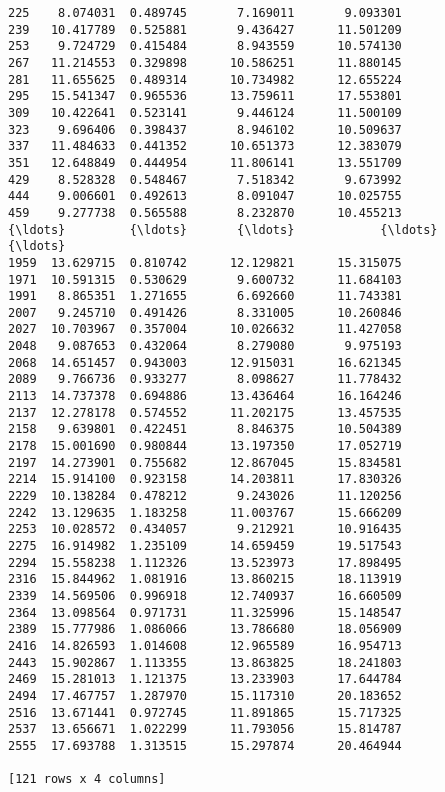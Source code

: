 \documentclass[11pt]{article}
\begin{document}
\begin{Verbatim}[commandchars=\\\{\}]
225    8.074031  0.489745       7.169011       9.093301
239   10.417789  0.525881       9.436427      11.501209
253    9.724729  0.415484       8.943559      10.574130
267   11.214553  0.329898      10.586251      11.880145
281   11.655625  0.489314      10.734982      12.655224
295   15.541347  0.965536      13.759611      17.553801
309   10.422641  0.523141       9.446124      11.500109
323    9.696406  0.398437       8.946102      10.509637
337   11.484633  0.441352      10.651373      12.383079
351   12.648849  0.444954      11.806141      13.551709
429    8.528328  0.548467       7.518342       9.673992
444    9.006601  0.492613       8.091047      10.025755
459    9.277738  0.565588       8.232870      10.455213
{\ldots}         {\ldots}       {\ldots}            {\ldots}            {\ldots}
1959  13.629715  0.810742      12.129821      15.315075
1971  10.591315  0.530629       9.600732      11.684103
1991   8.865351  1.271655       6.692660      11.743381
2007   9.245710  0.491426       8.331005      10.260846
2027  10.703967  0.357004      10.026632      11.427058
2048   9.087653  0.432064       8.279080       9.975193
2068  14.651457  0.943003      12.915031      16.621345
2089   9.766736  0.933277       8.098627      11.778432
2113  14.737378  0.694886      13.436464      16.164246
2137  12.278178  0.574552      11.202175      13.457535
2158   9.639801  0.422451       8.846375      10.504389
2178  15.001690  0.980844      13.197350      17.052719
2197  14.273901  0.755682      12.867045      15.834581
2214  15.914100  0.923158      14.203811      17.830326
2229  10.138284  0.478212       9.243026      11.120256
2242  13.129635  1.183258      11.003767      15.666209
2253  10.028572  0.434057       9.212921      10.916435
2275  16.914982  1.235109      14.659459      19.517543
2294  15.558238  1.112326      13.523973      17.898495
2316  15.844962  1.081916      13.860215      18.113919
2339  14.569506  0.996918      12.740937      16.660509
2364  13.098564  0.971731      11.325996      15.148547
2389  15.777986  1.086066      13.786680      18.056909
2416  14.826593  1.014608      12.965589      16.954713
2443  15.902867  1.113355      13.863825      18.241803
2469  15.281013  1.121375      13.233903      17.644784
2494  17.467757  1.287970      15.117310      20.183652
2516  13.671441  0.972745      11.891865      15.717325
2537  13.656671  1.022299      11.793056      15.814787
2555  17.693788  1.313515      15.297874      20.464944

[121 rows x 4 columns]

    \end{Verbatim}
\end{document}
